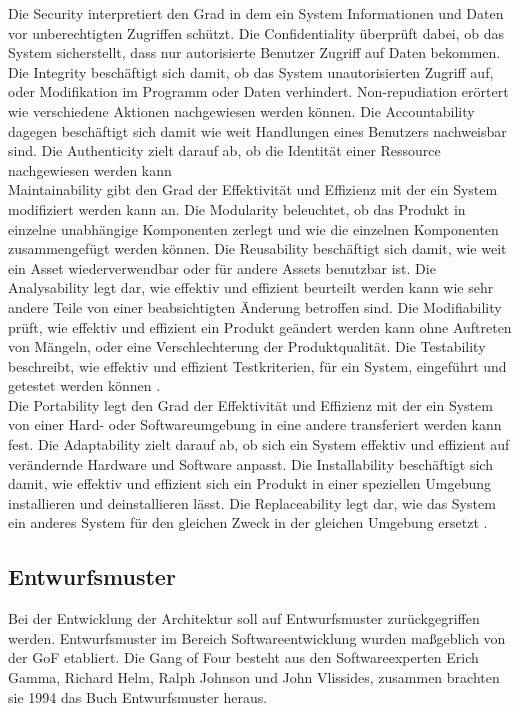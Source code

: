 Die Security interpretiert den Grad in dem ein System Informationen und Daten vor unberechtigten Zugriffen schützt. Die Confidentiality überprüft dabei, ob das System sicherstellt, dass nur autorisierte Benutzer Zugriff auf Daten bekommen. Die Integrity beschäftigt sich damit, ob das System unautorisierten Zugriff auf, oder Modifikation im Programm oder Daten verhindert. Non-repudiation erörtert wie verschiedene Aktionen nachgewiesen werden können. Die Accountability dagegen beschäftigt sich damit wie weit Handlungen eines Benutzers nachweisbar sind. Die Authenticity zielt darauf ab, ob die Identität einer Ressource nachgewiesen werden kann \cite{iso25010}\\


Maintainability gibt den Grad der Effektivität und Effizienz mit der ein System modifiziert werden kann an. Die Modularity beleuchtet, ob das Produkt in einzelne unabhängige Komponenten zerlegt und wie die einzelnen Komponenten zusammengefügt werden können. Die Reusability beschäftigt sich damit, wie weit ein Asset wiederverwendbar oder für andere Assets benutzbar ist. Die Analysability legt dar, wie effektiv und effizient beurteilt werden kann wie sehr andere Teile von einer beabsichtigten Änderung betroffen sind. Die Modifiability prüft, wie effektiv und effizient ein Produkt geändert werden kann ohne Auftreten von Mängeln, oder eine Verschlechterung der Produktqualität. Die Testability beschreibt, wie effektiv und effizient Testkriterien, für ein System, eingeführt und getestet werden können \cite{iso25010}.\\


Die Portability legt den Grad der Effektivität und Effizienz mit der ein System von einer Hard- oder Softwareumgebung in eine andere transferiert werden kann fest. Die Adaptability zielt darauf ab, ob sich ein System effektiv und effizient auf verändernde Hardware und Software anpasst. Die Installability beschäftigt sich damit, wie effektiv und effizient sich ein Produkt in einer speziellen Umgebung installieren und deinstallieren lässt. Die Replaceability legt dar, wie das System ein anderes System für den gleichen Zweck in der gleichen Umgebung ersetzt \cite{iso25010}.\\


\subsection{Entwurfsmuster}
Bei der Entwicklung der Architektur soll auf Entwurfsmuster zurückgegriffen werden. Entwurfsmuster im Bereich Softwareentwicklung wurden maßgeblich von der \ac{GoF} etabliert. Die Gang of Four besteht aus den Softwareexperten Erich Gamma, Richard Helm, Ralph Johnson und John Vlissides, zusammen brachten sie 1994 das Buch Entwurfsmuster heraus.\\

